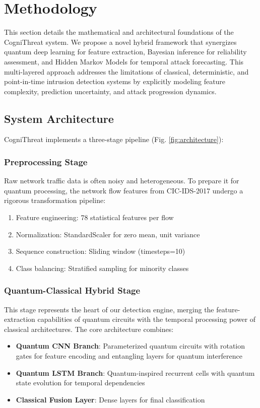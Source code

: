 \documentclass[conference]{IEEEtran}
\begin{document}
\section{Methodology}
This section details the mathematical and architectural foundations of the CogniThreat system. We propose a novel hybrid framework that synergizes quantum deep learning for feature extraction, Bayesian inference for reliability assessment, and Hidden Markov Models for temporal attack forecasting. This multi-layered approach addresses the limitations of classical, deterministic, and point-in-time intrusion detection systems by explicitly modeling feature complexity, prediction uncertainty, and attack progression dynamics.

\subsection{System Architecture}
CogniThreat implements a three-stage pipeline (Fig. \ref{fig:architecture}):

\subsubsection{Preprocessing Stage}
Raw network traffic data is often noisy and heterogeneous. To prepare it for quantum processing, the network flow features from CIC-IDS-2017 undergo a rigorous transformation pipeline:
\begin{enumerate}
    \item Feature engineering: 78 statistical features per flow
    \item Normalization: StandardScaler for zero mean, unit variance
    \item Sequence construction: Sliding window (timesteps=10)
    \item Class balancing: Stratified sampling for minority classes
\end{enumerate}

\subsubsection{Quantum-Classical Hybrid Stage}
This stage represents the heart of our detection engine, merging the feature-extraction capabilities of quantum circuits with the temporal processing power of classical architectures. The core architecture combines:
\begin{itemize}
    \item \textbf{Quantum CNN Branch}: Parameterized quantum circuits with rotation gates for feature encoding and entangling layers for quantum interference
    \item \textbf{Quantum LSTM Branch}: Quantum-inspired recurrent cells with quantum state evolution for temporal dependencies
    \item \textbf{Classical Fusion Layer}: Dense layers for final classification
\end{itemize}
\end{document}
